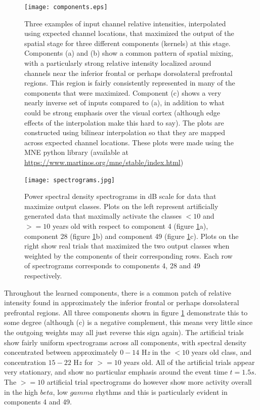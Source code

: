 \documentclass[fleqn,10pt]{wlscirep}
\begin{document}
\begin{figure}[h!]
  \centering\texttt{[image: components.eps]}
  \caption[textfind]{Three examples of input channel relative intensities, interpolated using expected channel locations, that maximized the output of the spatial stage for three different components (kernels) at this stage. Components (a) and (b) show a common pattern of spatial mixing, with a particularly strong relative intensity localized around channels near the inferior frontal or perhaps dorsolateral prefrontal regions. This region is fairly consistently represented in many of the components that were maximized. Component (c) shows a very nearly inverse set of inputs compared to (a), in addition to what could be strong emphasis over the visual cortex (although edge effects of the interpolation make this hard to say). The plots are constructed using bilinear interpolation so that they are mapped across expected channel locations. These plots were made using the MNE python library (available at \url{https://www.martinos.org/mne/stable/index.html})}
  \label{fig:max_components}
\end{figure}


\begin{figure}[ht]
  \caption{Power spectral density spectrograms in dB scale for data that maximize output classes. Plots on the left represent artificially generated data that maximally activate the classes $<10$ and $>=10$ years old with respect to component 4 (figure \ref{fig:max_components}a), component 28 (figure \ref{fig:max_components}b) and component 49 (figure \ref{fig:max_components}c). Plots on the right show real trials that maximized the two output classes when weighted by the components of their corresponding rows. Each row of spectrograms corresponds to components 4, 28 and 49 respectively.}
  \centering\texttt{[image: spectrograms.jpg]}
 \label{fig:max_spectrograms}
\end{figure}

Throughout the learned components, there is a common patch of relative intensity found in approximately the inferior frontal or perhaps dorsolateral prefrontal regions. All three components shown in figure \ref{fig:max_components} demonstrate this to some degree (although (c) is a negative complement, this means very little since the outgoing weights may all just reverse this sign again). The artificial trials show fairly uniform spectrograms across all components, with spectral density concentrated between approximately $0-14$ H{\em z} in the $<10$ years old class, and concentration $15-22$ H$z$ for $>=10$ years old. All of the artificial trials appear very stationary, and show no particular emphasis around the event time $t=1.5s$. The $>=10$ artificial trial spectrograms do however show more activity overall in the high $beta$, low $gamma$ rhythms and this is particularly evident in components 4 and 49.
\end{document}
